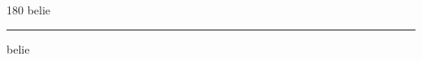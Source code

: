
\begin{frame}
\begin{center}
\begin{turn}{180}
{\fontsize{2.5cm}{1em}\selectfont belie}
\end{turn}
\vspace{1em}\par  
\hrule
\vspace{1em}\par  
{\fontsize{2.5cm}{1em}\selectfont belie}
\end{center}
\end{frame}

